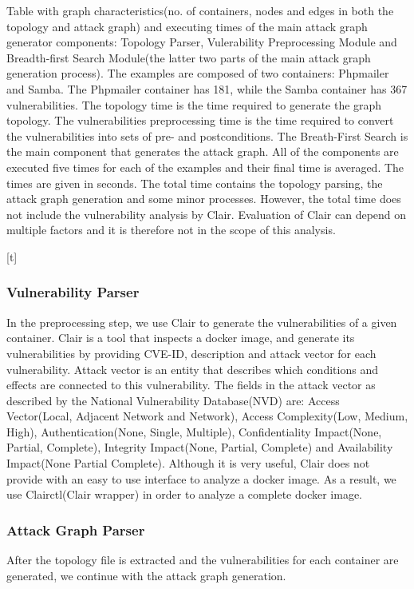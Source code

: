 \documentclass[letterpaper, 10 pt, conference]{ieeeconf}  %
\begin{document}
\begin{table}[t]
	\caption{Table with graph characteristics(no. of containers, nodes and edges in both the topology and attack graph) and executing times of the main attack graph generator components: Topology Parser, Vulerability Preprocessing Module and Breadth-first Search Module(the latter two parts of the main attack graph generation process). The examples are composed of two containers: Phpmailer and Samba. The Phpmailer container has 181, while the Samba container has 367 vulnerabilities. The topology time is the time required to generate the graph topology. The vulnerabilities preprocessing time is the time required to convert the vulnerabilities into sets of pre- and postconditions. The Breath-First Search is the main component that generates the attack graph. All of the components are executed five times for each of the examples and their final time is averaged. The times are given in seconds. The total time contains the topology parsing, the attack graph generation and some minor processes. However, the total time does not include the vulnerability analysis by Clair. Evaluation of Clair can depend on multiple factors and it is therefore not in the scope of this analysis.}
	
	\label{table_scalability}
\end{table}[t]

\subsubsection{Vulnerability Parser}
In the preprocessing step, we use Clair to generate the vulnerabilities of a given container. Clair is a tool that inspects a docker image, and generate its vulnerabilities by providing CVE-ID, description and attack vector for each vulnerability. Attack vector is an entity that describes which conditions and effects are connected to this vulnerability. The fields in the attack vector as described by the National Vulnerability Database(NVD) are: Access Vector(Local, Adjacent Network and Network), Access Complexity(Low, Medium, High), Authentication(None, Single, Multiple), Confidentiality Impact(None, Partial, Complete), Integrity Impact(None, Partial, Complete) and Availability Impact(None Partial Complete). Although it is very useful, Clair does not provide with an easy to use interface to analyze a docker image. As a result, we use Clairctl(Clair wrapper) in order to analyze a complete docker image.


\subsubsection{Attack Graph Parser}
After the topology file is extracted and the vulnerabilities for each container are generated, we continue with the attack graph generation.
\end{document}

